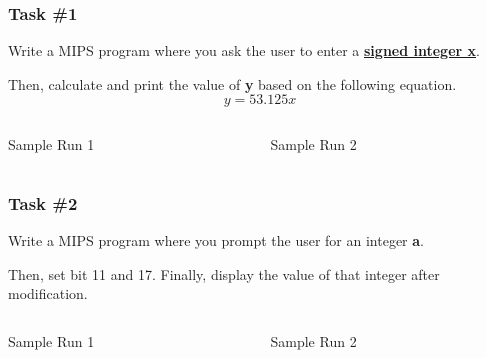 \documentclass[
	10pt, %
	hmargin=1cm,vmargin=0cm,head=0.5cm,headsep=0pt,foot=0.5cm,margin=2cm
]{beamer}
\begin{document}
\begin{frame}
	\frametitle{Task \#1}
	Write a MIPS program where you ask the user to enter a \underline{\textbf{signed integer x}}.

	Then, calculate and print the value of \textbf{y} based on the following equation.
	\begin{equation*}
		y = 53.125 x
	\end{equation*}


	\begin{columns}[c]
		\begin{column}{0.2\textwidth}
			Sample Run 1

		\end{column}
		\begin{column}{0.2\textwidth}
			Sample Run 2

		\end{column}
	\end{columns}
\end{frame}

\begin{frame}
	\frametitle{Task \#2}
	Write a MIPS program where you prompt the user for an integer \textbf{a}.

	Then, set bit 11 and 17. Finally, display the value of that integer after modification. \newline	
	
	

	\begin{columns}[c]
		\begin{column}{0.2\textwidth}
			Sample Run 1

		\end{column}
		\begin{column}{0.2\textwidth}
			Sample Run 2

		\end{column}
	\end{columns}
\end{frame}

\end{document}
